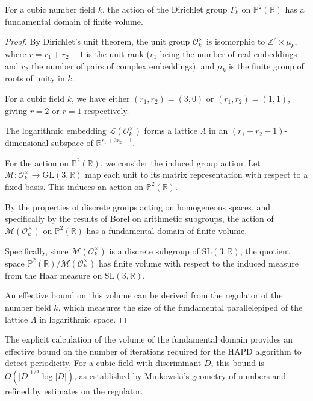 \begin{theorem}\label{thm:finite_volume}
For a cubic number field $k$, the action of the Dirichlet group $\Gamma_k$ on $\mathbb{P}^2(\mathbb{R})$ has a fundamental domain of finite volume.
\end{theorem}

\begin{proof}
By Dirichlet's unit theorem, the unit group $\mathcal{O}_k^\times$ is isomorphic to $\mathbb{Z}^r \times \mu_k$, where $r = r_1 + r_2 - 1$ is the unit rank ($r_1$ being the number of real embeddings and $r_2$ the number of pairs of complex embeddings), and $\mu_k$ is the finite group of roots of unity in $k$.

For a cubic field $k$, we have either $(r_1, r_2) = (3, 0)$ or $(r_1, r_2) = (1, 1)$, giving $r = 2$ or $r = 1$ respectively.

The logarithmic embedding $\mathcal{L}(\mathcal{O}_k^\times)$ forms a lattice $\Lambda$ in an $(r_1 + r_2 - 1)$-dimensional subspace of $\mathbb{R}^{r_1+2r_2-1}$.

For the action on $\mathbb{P}^2(\mathbb{R})$, we consider the induced group action. Let $\mathcal{M}: \mathcal{O}_k^\times \to \text{GL}(3, \mathbb{R})$ map each unit to its matrix representation with respect to a fixed basis. This induces an action on $\mathbb{P}^2(\mathbb{R})$.

By the properties of discrete groups acting on homogeneous spaces, and specifically by the results of Borel \cite{Borel1969} on arithmetic subgroups, the action of $\mathcal{M}(\mathcal{O}_k^\times)$ on $\mathbb{P}^2(\mathbb{R})$ has a fundamental domain of finite volume.

Specifically, since $\mathcal{M}(\mathcal{O}_k^\times)$ is a discrete subgroup of $\text{SL}(3, \mathbb{R})$, the quotient space $\mathbb{P}^2(\mathbb{R})/\mathcal{M}(\mathcal{O}_k^\times)$ has finite volume with respect to the induced measure from the Haar measure on $\text{SL}(3, \mathbb{R})$.

An effective bound on this volume can be derived from the regulator of the number field $k$, which measures the size of the fundamental parallelepiped of the lattice $\Lambda$ in logarithmic space.
\end{proof}

\begin{remark}
The explicit calculation of the volume of the fundamental domain provides an effective bound on the number of iterations required for the HAPD algorithm to detect periodicity. For a cubic field with discriminant $D$, this bound is $O(|D|^{1/2} \log|D|)$, as established by Minkowski's geometry of numbers and refined by estimates on the regulator.
\end{remark}

